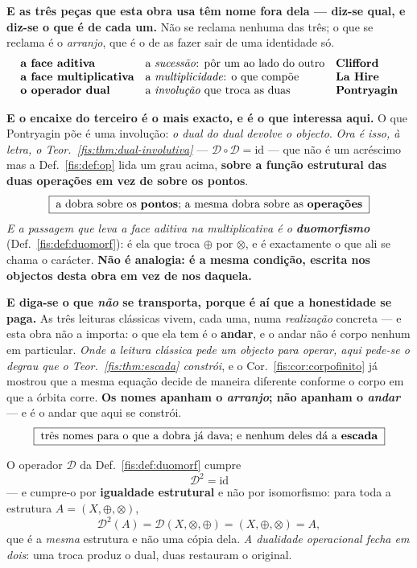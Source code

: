 \documentclass[livro.tex]{subfiles}
\begin{document}
\medskip\noindent\textbf{E as três peças que esta obra usa têm nome fora dela ---
diz-se qual, e diz-se o que é de cada um.} Não se reclama nenhuma das três; o que
se reclama é o \emph{arranjo}, que é o de as fazer sair de uma identidade só.
\[
\begin{array}{lll}
\textbf{a face aditiva} & \text{a \emph{sucessão}: pôr um ao lado do outro} & \text{\textbf{Clifford}}\\
\textbf{a face multiplicativa} & \text{a \emph{multiplicidade}: o que compõe} & \text{\textbf{La~Hire}}\\
\textbf{o operador dual} & \text{a \emph{involução} que troca as duas} & \text{\textbf{Pontryagin}}
\end{array}
\]

\medskip\noindent\textbf{E o encaixe do terceiro é o mais exacto, e é o que
interessa aqui.} O que Pontryagin põe é uma involução: \emph{o dual do dual
devolve o objecto}. \emph{Ora é isso, à letra, o Teor.~\ref{fis:thm:dual-involutiva}}
--- $\mathcal{D}\circ\mathcal{D}=\mathrm{id}$ --- que não é um acréscimo mas a
Def.~\ref{fis:def:op} lida um grau acima, \textbf{sobre a função estrutural das
duas operações em vez de sobre os pontos}.
\[
\boxed{\;\text{a dobra sobre os \textbf{pontos}; a mesma dobra sobre as \textbf{operações}}\;}
\]
\emph{E a passagem que leva a face aditiva na multiplicativa é o
\textbf{duomorfismo}} (Def.~\ref{fis:def:duomorf}): é ela que troca $\oplus$ por
$\otimes$, e é exactamente o que ali se chama o carácter. \textbf{Não é analogia:
é a mesma condição, escrita nos objectos desta obra em vez de nos daquela.}

\medskip\noindent\textbf{E diga-se o que \emph{não} se transporta, porque é aí que
a honestidade se paga.} As três leituras clássicas vivem, cada uma, numa
\emph{realização} concreta --- e esta obra não a importa: o que ela tem é o
\textbf{andar}, e o andar não é corpo nenhum em particular. \emph{Onde a leitura
clássica pede um objecto para operar, aqui pede-se o degrau que o Teor.~\ref{fis:thm:escada}
constrói}, e o Cor.~\ref{fis:cor:corpofinito} já mostrou que a mesma equação decide
de maneira diferente conforme o corpo em que a órbita corre. \textbf{Os nomes
apanham o \emph{arranjo}; não apanham o \emph{andar}} --- e é o andar que aqui se
constrói.
\[
\boxed{\;\text{três nomes para o que a dobra já dava; e nenhum deles dá a \textbf{escada}}\;}
\]

\begin{teorema}\label{fis:thm:dual-involutiva}
O operador $\mathcal{D}$ da Def.~\ref{fis:def:duomorf} cumpre
\[
\boxed{\;\mathcal{D}^{2}=\mathrm{id}\;}
\]
--- e cumpre-o por \textbf{igualdade estrutural} e não por isomorfismo: para toda
a estrutura $A=(X,\oplus,\otimes)$,
\[
\mathcal{D}^{2}(A)=\mathcal{D}(X,\otimes,\oplus)=(X,\oplus,\otimes)=A ,
\]
que é a \emph{mesma} estrutura e não uma cópia dela. \emph{A dualidade
operacional fecha em dois}: uma troca produz o dual, duas restauram o original.
\end{teorema}
\end{document}
